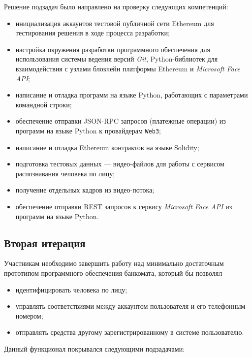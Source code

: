 Решение подзадач было направлено на проверку следующих компетенций:
\begin{itemize}
    \item инициализация аккаунтов тестовой публичной сети Ethereum для тестирования
    решения в ходе процесса разработки;
    \item настройка окружения разработки программного обеспечения для использования
    системы ведения версий \textit{Git}, Python-библиотек для взаимодействия с
    узлами блокчейн платформы Ethereum и \textit{Microsoft Face API};
    \item написание и отладка программ на языке Python, работающих с параметрами
    командной строки;
    \item обеспечение отправки JSON-RPC запросов (платежные операции) из программ
    на языке Python к провайдерам \texttt{Web3};
    \item написание и отладка Ethereum контрактов на языке Solidity;
    \item подготовка тестовых данных --- видео-файлов для работы с сервисом
    распознавания человека по лицу;
    \item получение отдельных кадров из видео-потока; 
    \item обеспечение отправки REST запросов к сервису \textit{Microsoft Face API}
    из программ на языке Python.
\end{itemize}

\subsection*{Вторая итерация}

Участникам необходимо завершить работу над минимально достаточным прототипом
программного обеспечения банкомата, который бы позволял
\begin{itemize}
    \item идентифицировать человека по лицу;
    \item управлять соответствиями между аккаунтом пользователя и его телефонным номером;
    \item отправлять средства другому зарегистрированному в системе пользователю.
\end{itemize}
Данный функционал покрывался следующими подзадачами:

